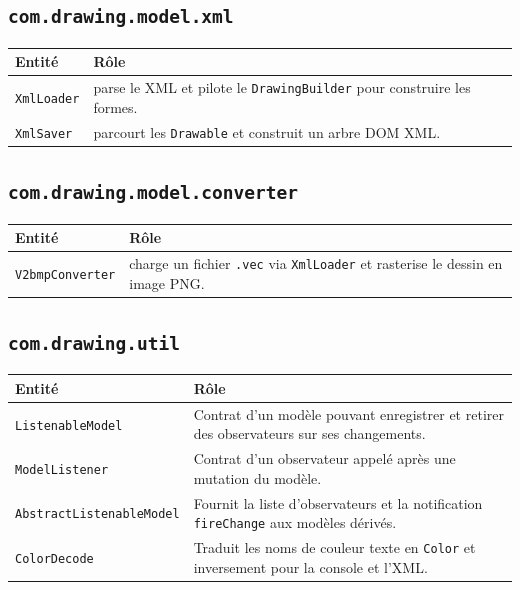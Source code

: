 \documentclass[11pt,a4paper]{article}
\begin{document}
\subsection{\protect\texttt{com.drawing.model.xml}}

\begin{tabular}{|>{\raggedright\arraybackslash}p{}|p{}|}
\hline
\textbf{Entité} & \textbf{Rôle} \\
\hline
\texttt{XmlLoader} & parse le XML et pilote le \texttt{DrawingBuilder} pour construire les formes. \\
\hline
\texttt{XmlSaver} & parcourt les \texttt{Drawable} et construit un arbre DOM XML. \\
\hline
\end{tabular}

\subsection{\protect\texttt{com.drawing.model.converter}}

\begin{tabular}{|>{\raggedright\arraybackslash}p{}|p{}|}
\hline
\textbf{Entité} & \textbf{Rôle} \\
\hline
\texttt{V2bmpConverter} & charge un fichier \texttt{.vec} via \texttt{XmlLoader} et rasterise le dessin en image PNG. \\
\hline
\end{tabular}

\subsection{\protect\texttt{com.drawing.util}}

\begin{tabular}{|>{\raggedright\arraybackslash}p{}|p{}|}
\hline
\textbf{Entité} & \textbf{Rôle} \\
\hline
\texttt{ListenableModel} & Contrat d'un modèle pouvant enregistrer et retirer des observateurs sur ses changements. \\
\hline
\texttt{ModelListener} & Contrat d'un observateur appelé après une mutation du modèle. \\
\hline
\texttt{AbstractList\-enable\-Model} & Fournit la liste d'observateurs et la notification \texttt{fireChange} aux modèles dérivés. \\
\hline
\texttt{ColorDecode} & Traduit les noms de couleur texte en \texttt{Color} et inversement pour la console et l'XML. \\
\hline
\end{tabular}
\end{document}
